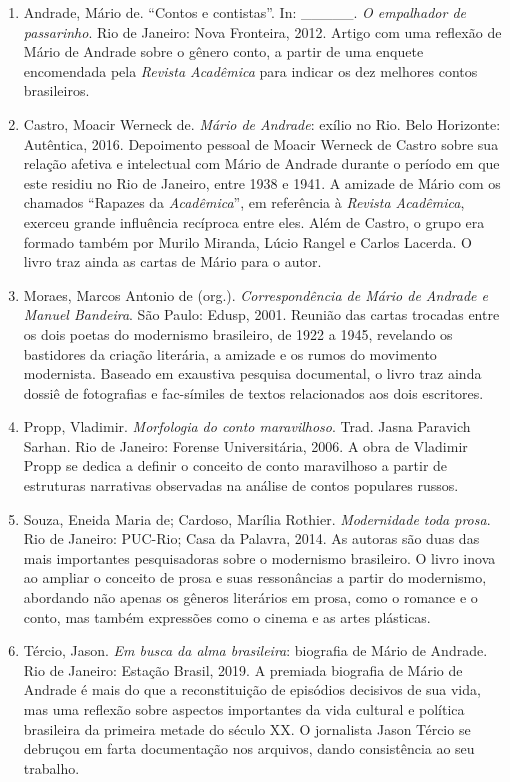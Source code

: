 \documentclass{article}
\begin{document}
\begin{enumerate}
\item
  Andrade, Mário de. ``Contos e contistas''. In: \_\_\_\_\_. \emph{O
  empalhador de passarinho}. Rio de Janeiro: Nova Fronteira, 2012.
  Artigo com uma reflexão de Mário de Andrade sobre o gênero conto, a
  partir de uma enquete encomendada pela \emph{Revista Acadêmica} para
  indicar os dez melhores contos brasileiros.
\item
  Castro, Moacir Werneck de. \emph{Mário de Andrade}: exílio no Rio.
  Belo Horizonte: Autêntica, 2016. Depoimento pessoal de Moacir Werneck
  de Castro sobre sua relação afetiva e intelectual com Mário de Andrade
  durante o período em que este residiu no Rio de Janeiro, entre 1938 e
  1941. A amizade de Mário com os chamados ``Rapazes da
  \emph{Acadêmica}'', em referência à \emph{Revista Acadêmica}, exerceu
  grande influência recíproca entre eles. Além de Castro, o grupo era
  formado também por Murilo Miranda, Lúcio Rangel e Carlos Lacerda. O
  livro traz ainda as cartas de Mário para o autor.
\item
  Moraes, Marcos Antonio de (org.). \emph{Correspondência de Mário de
  Andrade e Manuel Bandeira}. São Paulo: Edusp, 2001. Reunião das cartas
  trocadas entre os dois poetas do modernismo brasileiro, de 1922 a
  1945, revelando os bastidores da criação literária, a amizade e os
  rumos do movimento modernista. Baseado em exaustiva pesquisa
  documental, o livro traz ainda dossiê de fotografias e fac-símiles de
  textos relacionados aos dois escritores.
\item
  Propp, Vladimir. \emph{Morfologia do conto maravilhoso}. Trad. Jasna
  Paravich Sarhan. Rio de Janeiro: Forense Universitária, 2006. A obra
  de Vladimir Propp se dedica a definir o conceito de conto maravilhoso
  a partir de estruturas narrativas observadas na análise de contos
  populares russos.
\item
  Souza, Eneida Maria de; Cardoso, Marília Rothier. \emph{Modernidade
  toda prosa}. Rio de Janeiro: PUC-Rio; Casa da Palavra, 2014. As
  autoras são duas das mais importantes pesquisadoras sobre o modernismo
  brasileiro. O livro inova ao ampliar o conceito de prosa e suas
  ressonâncias a partir do modernismo, abordando não apenas os gêneros
  literários em prosa, como o romance e o conto, mas também expressões
  como o cinema e as artes plásticas.
\item
  Tércio, Jason. \emph{Em busca da alma brasileira}: biografia de Mário
  de Andrade. Rio de Janeiro: Estação Brasil, 2019. A premiada biografia
  de Mário de Andrade é mais do que a reconstituição de episódios
  decisivos de sua vida, mas uma reflexão sobre aspectos importantes da
  vida cultural e política brasileira da primeira metade do século XX. O
  jornalista Jason Tércio se debruçou em farta documentação nos
  arquivos, dando consistência ao seu trabalho.
\end{enumerate}
\end{document}
